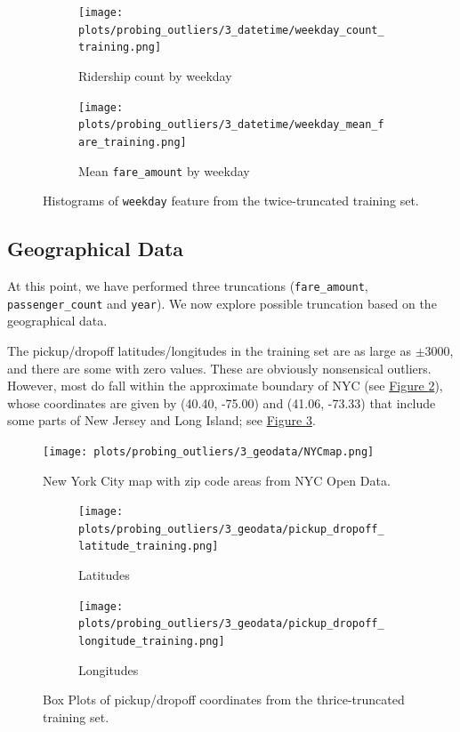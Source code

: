 \documentclass[12pt,letterpaper,final]{article}
\numberwithin{equation}{section}
\begin{document}
\begin{figure}[H]
\centering
\begin{subfigure}{0.6\textwidth}
  \centering
  \texttt{[image: plots/probing\_outliers/3\_datetime/weekday\_count\_training.png]}
\caption{Ridership count by weekday}
\end{subfigure}%
\hspace*{-2cm}
\begin{subfigure}{.6\textwidth}
  \centering
  \texttt{[image: plots/probing\_outliers/3\_datetime/weekday\_mean\_fare\_training.png]}
  \caption{Mean \texttt{fare\_amount} by weekday}
\end{subfigure}
\caption{Histograms of \texttt{weekday} feature from the twice-truncated training set.}
\label{weekday_count_training}
\end{figure}

\subsection{Geographical Data}

At this point, we have performed three truncations (\verb|fare_amount|, \verb|passenger_count| and \verb|year|). We now explore possible truncation based on the geographical data. 

The pickup/dropoff latitudes/longitudes in the training set are as large as $\pm 3000$, and there are some with zero values. These are obviously nonsensical outliers. However, most do fall within the approximate boundary of NYC (see \hyperref[NYCmap]{Figure \ref*{NYCmap}}), whose coordinates are given by (40.40, -75.00) and (41.06, -73.33) that include some parts of New Jersey and Long Island; see \hyperref[coordinates_box]{Figure \ref*{coordinates_box}}. 


\begin{figure}[H]
\begin{center}
\texttt{[image: plots/probing\_outliers/3\_geodata/NYCmap.png]}
\caption{New York City map with zip code areas from NYC Open Data.}\label{NYCmap}
\end{center}
\end{figure}

\vspace*{-20pt}

\begin{figure}[H]
\centering
\begin{subfigure}{0.6\textwidth}
  \centering
  \texttt{[image: plots/probing\_outliers/3\_geodata/pickup\_dropoff\_latitude\_training.png]}
\caption{Latitudes}
\end{subfigure}%
\hspace*{-2cm}
\begin{subfigure}{.6\textwidth}
  \centering
  \texttt{[image: plots/probing\_outliers/3\_geodata/pickup\_dropoff\_longitude\_training.png]}
  \caption{Longitudes}
\end{subfigure}
\caption{Box Plots of pickup/dropoff coordinates from the thrice-truncated training set.}
\label{coordinates_box}
\end{figure}
\end{document}

